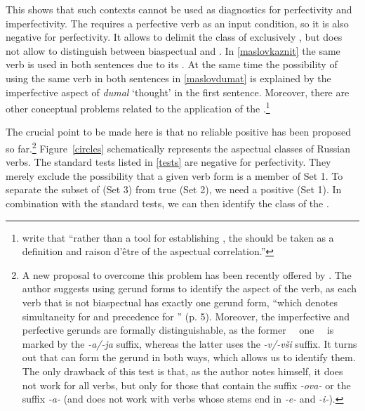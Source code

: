 This shows that such contexts cannot be used as diagnostics for perfectivity and imperfectivity. The  requires a perfective verb as an input condition, so it is also negative for perfectivity. It allows to delimit the class of exclusively , but does not allow to distinguish between biaspectual and . In \ref{maslovkaznit} the same verb is used in both sentences due to its . At the same time the possibility of using the same verb in both sentences in \ref{maslovdumat} is explained by the imperfective aspect of \textit{dumal} `thought' in the first sentence. Moreover, there are other conceptual problems related to the application of the .\footnote{\citet[2]{Mikaelian:07} write that ``rather than a tool for establishing , the  should be taken as a definition and raison d'\^etre of the aspectual correlation.''}

The crucial point to be made here is that no reliable positive  has been proposed so far.\footnote{A new proposal to overcome this problem has been recently offered by \citet{Piperski:biasp}. The author suggests using gerund forms to identify the aspect of the verb, as each verb that is not biaspectual has exactly one gerund form, ``which denotes simultaneity for  and precedence for '' (p. 5). Moreover, the imperfective  and perfective gerunds are formally distinguishable, as the former ~~one~~ is marked by the \textit{-a/-ja} suffix, whereas the latter uses the \textit{-v/-v\v{s}i} suffix. It turns out that  can form the gerund in both ways, which allows us to identify them. The only drawback of this test is that, as the author notes himself, it does not work for all verbs, but only for those that contain the suffix \textit{-ova-} or the suffix \textit{-a-} (and does not work with verbs whose stems end in \textit{-e-} and \textit{-i-}).} Figure~\ref{circles} schematically represents the aspectual classes of Russian verbs. The standard tests listed in \ref{tests} are negative for perfectivity. They merely exclude the possibility that a given verb form is a member of Set 1. To separate the subset of  (Set 3) from true  (Set 2), we need a positive  (Set 1). In combination with the standard tests, we can then identify the class of the .\largerpage

